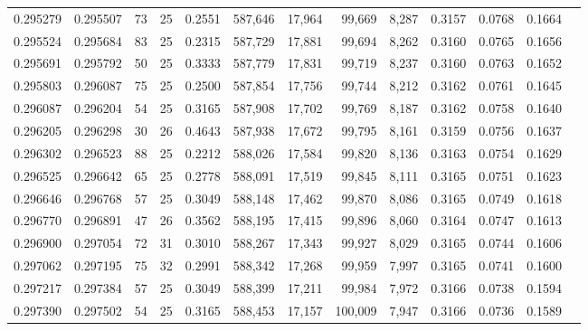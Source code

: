 \begin{tabular}{rrrrrrrrrrrrr}
0.295279 & 0.295507 &  73 &  25 &                                     0.2551 & 587,646 &  17,964 &  99,669 &   8,287 & 0.3157 & 0.0768 & 0.1664 \\
0.295524 & 0.295684 &  83 &  25 &                                     0.2315 & 587,729 &  17,881 &  99,694 &   8,262 & 0.3160 & 0.0765 & 0.1656 \\
0.295691 & 0.295792 &  50 &  25 &                                     0.3333 & 587,779 &  17,831 &  99,719 &   8,237 & 0.3160 & 0.0763 & 0.1652 \\
0.295803 & 0.296087 &  75 &  25 &                                     0.2500 & 587,854 &  17,756 &  99,744 &   8,212 & 0.3162 & 0.0761 & 0.1645 \\
0.296087 & 0.296204 &  54 &  25 &                                     0.3165 & 587,908 &  17,702 &  99,769 &   8,187 & 0.3162 & 0.0758 & 0.1640 \\
0.296205 & 0.296298 &  30 &  26 &                                     0.4643 & 587,938 &  17,672 &  99,795 &   8,161 & 0.3159 & 0.0756 & 0.1637 \\
0.296302 & 0.296523 &  88 &  25 &                                     0.2212 & 588,026 &  17,584 &  99,820 &   8,136 & 0.3163 & 0.0754 & 0.1629 \\
0.296525 & 0.296642 &  65 &  25 &                                     0.2778 & 588,091 &  17,519 &  99,845 &   8,111 & 0.3165 & 0.0751 & 0.1623 \\
0.296646 & 0.296768 &  57 &  25 &                                     0.3049 & 588,148 &  17,462 &  99,870 &   8,086 & 0.3165 & 0.0749 & 0.1618 \\
0.296770 & 0.296891 &  47 &  26 &                                     0.3562 & 588,195 &  17,415 &  99,896 &   8,060 & 0.3164 & 0.0747 & 0.1613 \\
0.296900 & 0.297054 &  72 &  31 &                                     0.3010 & 588,267 &  17,343 &  99,927 &   8,029 & 0.3165 & 0.0744 & 0.1606 \\
0.297062 & 0.297195 &  75 &  32 &                                     0.2991 & 588,342 &  17,268 &  99,959 &   7,997 & 0.3165 & 0.0741 & 0.1600 \\
0.297217 & 0.297384 &  57 &  25 &                                     0.3049 & 588,399 &  17,211 &  99,984 &   7,972 & 0.3166 & 0.0738 & 0.1594 \\
0.297390 & 0.297502 &  54 &  25 &                                     0.3165 & 588,453 &  17,157 & 100,009 &   7,947 & 0.3166 & 0.0736 & 0.1589 \\

\end{tabular}
